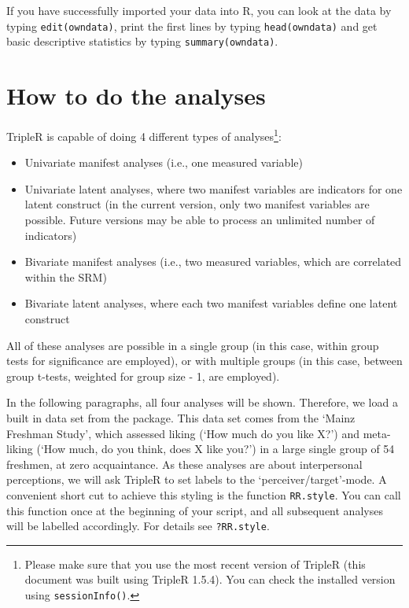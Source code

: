 \documentclass[a4paper]{article}\usepackage[]{graphicx}\usepackage[]{color}
\begin{document}
If you have successfully imported your data into R, you can look at the data by typing \texttt{edit(owndata)}, print the first lines by typing \texttt{head(owndata)} and get basic descriptive statistics by typing \texttt{summary(owndata)}.



\section{How to do the analyses}
TripleR is capable of doing 4 different types of analyses\footnote{Please make sure that you use the most recent version of TripleR (this document was built using TripleR 1.5.4). You can check the installed version using \texttt{sessionInfo()}.}:
\begin{itemize}

	\item Univariate manifest analyses (i.e., one measured variable)

	\item Univariate latent analyses, where two manifest variables are indicators for one latent construct (in the current version, only two manifest variables are possible. Future versions may be able to process an unlimited number of indicators)

	\item Bivariate manifest analyses (i.e., two measured variables, which are correlated within the SRM)

	\item Bivariate latent analyses, where each two manifest variables define one latent construct
\end{itemize}


All of these analyses are possible in a single group (in this case, within group tests for significance are employed), or with multiple groups (in this case, between group t-tests, weighted for group size - 1, are employed).


In the following paragraphs, all four analyses will be shown. Therefore, we load a built in data set from the package. This data set comes from the `Mainz Freshman Study', which assessed liking (`How much do you like X?') and meta-liking (`How much, do you think, does X like you?') in a large single group of 54 freshmen, at zero acquaintance. 
As these analyses are about interpersonal perceptions, we will ask TripleR to set labels to the `perceiver/target'-mode. A convenient short cut to achieve this styling is the function \texttt{RR.style}. You can call this function once at the beginning of your script, and all subsequent analyses will be labelled accordingly. For details see \texttt{?RR.style}.
\end{document}

